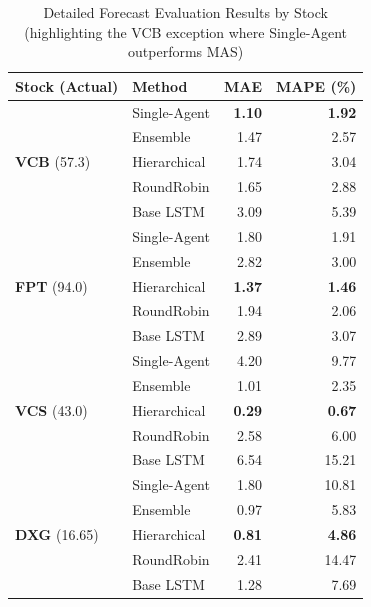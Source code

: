 \documentclass{ieeeaccess}
\begin{document}
\begin{table}[htbp]
    \centering
\caption{Detailed Forecast Evaluation Results by Stock (highlighting the VCB exception where Single-Agent outperforms MAS)}
    \label{tab:stock_prediction_results}
    \begin{tabular}{llrr}
        \toprule
        \textbf{Stock (Actual)} & \textbf{Method} & \textbf{MAE} & \textbf{MAPE (\%)} \\
        \midrule
        
        \multirow{5}{*}{\textbf{VCB} (57.3)} 
         & Single-Agent & \textbf{1.10} & \textbf{1.92} \\
         & Ensemble & 1.47 & 2.57 \\
         & Hierarchical & 1.74 & 3.04 \\
         & RoundRobin & 1.65 & 2.88 \\
         & Base LSTM & 3.09 & 5.39 \\
        \cmidrule{1-4}
        
        \multirow{5}{*}{\textbf{FPT} (94.0)} 
         & Single-Agent & 1.80 & 1.91 \\
         & Ensemble & 2.82 & 3.00 \\
         & Hierarchical & \textbf{1.37} & \textbf{1.46} \\
         & RoundRobin & 1.94 & 2.06 \\
         & Base LSTM & 2.89 & 3.07 \\
        \cmidrule{1-4}
        
        \multirow{5}{*}{\textbf{VCS} (43.0)} 
         & Single-Agent & 4.20 & 9.77 \\
         & Ensemble & 1.01 & 2.35 \\
         & Hierarchical & \textbf{0.29} & \textbf{0.67} \\
         & RoundRobin & 2.58 & 6.00 \\
         & Base LSTM & 6.54 & 15.21 \\
        \cmidrule{1-4}
        
        \multirow{5}{*}{\textbf{DXG} (16.65)} 
         & Single-Agent & 1.80 & 10.81 \\
         & Ensemble & 0.97 & 5.83 \\
         & Hierarchical & \textbf{0.81} & \textbf{4.86} \\
         & RoundRobin & 2.41 & 14.47 \\
         & Base LSTM & 1.28 & 7.69 \\
         
        \bottomrule
    \end{tabular}
\end{table}
\end{document}
